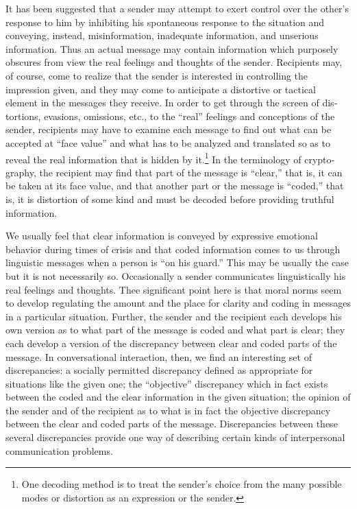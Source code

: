 \documentclass[openany,nobib]{tufte-book}
\begin{document}
It has been suggested that a sender may attempt to exert control over
the other's response to him by inhibiting his spontaneous response to
the situation and conveying, instead, misinformation, inadequate
information, and unserious information. Thus an actual message may
contain information which purposely obscures from view the real feelings
and thoughts of the sender. Recipients may, of course, come to realize
that the sender is interested in controlling the impression given, and
they may come to anticipate a distortive or tactical element in the
mes­sages they receive. In order to get through the screen of
dis­tortions, evasions, omissions, etc., to the ``real'' feelings and
conceptions of the sender, recipients may have to examine each message
to find out what can be accepted at ``face value'' and what has to be
analyzed and translated so as to reveal the real information that is
hidden by it.\footnote{One decoding method is to treat the sender's
  choice from the many possible modes or distortion as an expression or
  the sender.} In the terminology of crypto­graphy, the recipient may
find that part of the message is ``clear,'' that is, it can be taken at
its face value, and that another part or the message is ``coded,'' that
is, it is distor­tion of some kind and must be decoded before providing
truthful information.

We usually feel that clear information is conveyed by expressive
emotional behavior during times of crisis and that coded information
comes to us through linguistic messages when a person is ``on his
guard.'' This may be usually the case but it is not necessarily so.
Occasionally a sender communicates linguistically his real feelings and
thoughts. Thee significant point here is that moral norms seem to
develop regulating the amount and the place for clarity and coding in
messages in a particular situation. Further, the sender and the
recipient each develops his own version as to what part of the message
is coded and what part is clear; they each develop a version of the
discrepancy between clear and coded parts of the message. In
con­versational interaction, then, we find an interesting set of
discrepancies: a socially permitted discrepancy defined as ap­propriate
for situations like the given one; the ``objective'' discrepancy which
in fact exists between the coded and the clear information in the given
situation; the opinion of the sender and of the recipient as to what is
in fact the objective discrepancy between the clear and coded parts of
the message. Discrepancies between these several discrepancies provide
one way of describing certain kinds of interpersonal communication
problems.
\end{document}

